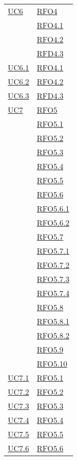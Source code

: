\begin{longtable}{|>{\centering}m{5cm}|m{5cm}<{\centering}|}
\hyperlink{UC6}{UC6} & \hyperlink{RFO4}{RFO4}\\
& \hyperlink{RFO4.1}{RFO4.1}\\
& \hyperlink{RFO4.2}{RFO4.2}\\
& \hyperlink{RFD4.3}{RFD4.3}\\\hline
\hyperlink{UC6.1}{UC6.1} & \hyperlink{RFO4.1}{RFO4.1}\\ \hline
\hyperlink{UC6.2}{UC6.2} & \hyperlink{RFO4.2}{RFO4.2}\\ \hline
\hyperlink{UC6.3}{UC6.3} & \hyperlink{RFD4.3}{RFD4.3}\\ \hline
\hyperlink{UC7}{UC7} & \hyperlink{RFO5}{RFO5}\\
& \hyperlink{RFO5.1}{RFO5.1}\\
& \hyperlink{RFO5.2}{RFO5.2}\\
& \hyperlink{RFO5.3}{RFO5.3}\\
& \hyperlink{RFO5.4}{RFO5.4}\\
& \hyperlink{RFO5.5}{RFO5.5}\\
& \hyperlink{RFO5.6}{RFO5.6}\\
& \hyperlink{RFO5.6.1}{RFO5.6.1}\\
& \hyperlink{RFO5.6.2}{RFO5.6.2}\\
& \hyperlink{RFO5.7}{RFO5.7}\\
& \hyperlink{RFO5.7.1}{RFO5.7.1}\\
& \hyperlink{RFO5.7.2}{RFO5.7.2}\\
& \hyperlink{RFO5.7.3}{RFO5.7.3}\\
& \hyperlink{RFO5.7.4}{RFO5.7.4}\\
& \hyperlink{RFO5.8}{RFO5.8}\\
& \hyperlink{RFO5.8.1}{RFO5.8.1}\\
& \hyperlink{RFO5.8.2}{RFO5.8.2}\\
& \hyperlink{RFO5.9}{RFO5.9}\\
& \hyperlink{RFO5.10}{RFO5.10}\\ \hline
\hyperlink{UC7.1}{UC7.1} & \hyperlink{RFO5.1}{RFO5.1}\\\hline
\hyperlink{UC7.2}{UC7.2} & \hyperlink{RFO5.2}{RFO5.2}\\\hline
\hyperlink{UC7.3}{UC7.3} & \hyperlink{RFO5.3}{RFO5.3}\\\hline
\hyperlink{UC7.4}{UC7.4} & \hyperlink{RFO5.4}{RFO5.4}\\\hline
\hyperlink{UC7.5}{UC7.5} & \hyperlink{RFO5.5}{RFO5.5}\\\hline
\hyperlink{UC7.6}{UC7.6} & \hyperlink{RFO5.6}{RFO5.6}\\

\end{longtable}

